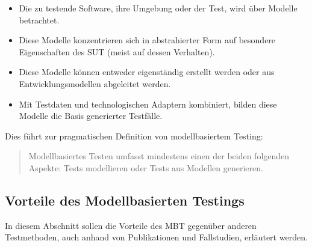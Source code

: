 \begin{itemize}
\item Die zu testende Software, ihre Umgebung oder der Test, wird über Modelle betrachtet.
\item Diese Modelle konzentrieren sich in abstrahierter Form auf besondere Eigenschaften des SUT (meist auf dessen Verhalten).
\item Diese Modelle können entweder eigenständig erstellt werden oder aus Entwicklungsmodellen abgeleitet werden.
\item Mit Testdaten und technologischen Adaptern kombiniert, bilden diese Modelle die Basis generierter Testfälle.
\end{itemize}

Dies führt zur pragmatischen Definition von modellbasiertem Testing:

\begin{quote}
Modellbasiertes Testen umfasst mindestens einen der beiden folgenden Aspekte: Tests modellieren oder Tests aus Modellen generieren.
\end{quote}

\subsection{Vorteile des Modellbasierten Testings}
\label{sec:mbt_vorteile}
In diesem Abschnitt sollen die Vorteile des MBT gegenüber anderen Testmethoden, auch anhand von Publikationen und Fallstudien, erläutert werden.

